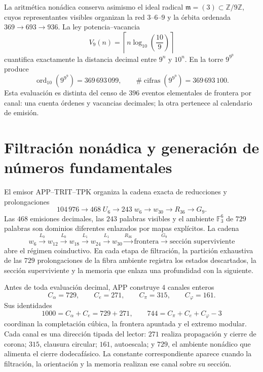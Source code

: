 La aritmética nonádica conserva asimismo el ideal radical
\(\mathfrak m=(3)\subset\mathbb Z/9\mathbb Z\), cuyos representantes
visibles organizan la red \(3\)--\(6\)--\(9\) y la órbita ordenada
\(369\to693\to936\). La ley potencia--vacancia
\[
 V_9(n)=\left\lceil n\log_{10}\!\left(\frac{10}{9}\right)\right\rceil
\]
cuantifica exactamente la distancia decimal entre \(9^n\) y \(10^n\). En
la torre \(9^{9^9}\) produce
\[
 \operatorname{ord}_{10}\!\left(9^{9^9}\right)=369\,693\,099,
 \qquad
 \#\operatorname{cifras}\!\left(9^{9^9}\right)=369\,693\,100.
\]
Esta evaluación es distinta del censo de \(396\) eventos elementales de
frontera por canal: una
cuenta órdenes y vacancias decimales; la otra pertenece al calendario de
emisión.

\section*{Filtración nonádica y generación de números fundamentales}

El emisor APP--TRIT--TPK organiza la cadena exacta de reducciones y
prolongaciones
\[
 104\,976\longrightarrow468\;U_6\longrightarrow243\;w_6
 \longrightarrow w_{30}\longrightarrow R_{36}\longrightarrow G_9.
\]
Las \(468\) emisiones decimales, las \(243\) palabras visibles y el ambiente
\(\mathbb F_3^6\) de \(729\) palabras son dominios diferentes enlazados por
mapas explícitos. La cadena
\[
 w_6\xrightarrow{L_0}w_{12}\xrightarrow{L_0}w_{18}
 \xrightarrow{L_1}w_{24}\xrightarrow{L_1}w_{30}
 \xrightarrow{R_{36}}\text{frontera}
 \xrightarrow{G_9}\text{sección superviviente}
\]
abre el régimen coinductivo. En cada etapa de filtración, la partición
exhaustiva de las \(729\) prolongaciones de la fibra ambiente registra los
estados descartados, la sección superviviente y
la memoria que enlaza una profundidad con la siguiente.

Antes de toda evaluación decimal, APP construye \(4\) canales enteros
\[
 C_\alpha=729,\qquad C_e=271,\qquad
 C_\pi=315,\qquad C_\varphi=161.
\]
Sus identidades
\[
 1000=C_\alpha+C_e=729+271,
 \qquad
 744=C_\pi+C_e+C_\varphi-3
\]
coordinan la completación cúbica, la frontera apuntada y el extremo modular.
Cada canal es una dirección tipada del lector: \(271\) realiza propagación y
cierre de corona; \(315\), clausura circular; \(161\), autoescala; y
\(729\), el ambiente nonádico que alimenta el cierre dodecafásico. La
constante correspondiente aparece cuando la filtración, la orientación y la
memoria realizan ese canal sobre su sección.

